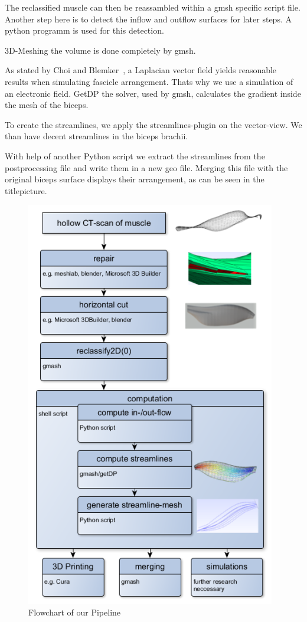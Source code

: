 \documentclass[preprint,journal]{vgtc}       %
\begin{document}
The reclassified muscle can then be reassambled within a gmsh specific script file.
Another step here is to detect the inflow and outflow surfaces for later steps. 
A python programm is used for this detection. 

3D-Meshing the volume is done completely by gmsh. %
 
As stated by Choi and Blemker~\cite{Choi2013}, a Laplacian vector field yields reasonable results when simulating fascicle arrangement. 
Thats why we use a simulation of an electronic field. 
GetDP the solver, used by gmsh, calculates the gradient inside the mesh of the biceps.

To create the streamlines, we apply the streamlines-plugin on the vector-view. 
We than have decent streamlines in the biceps brachii.

With help of another Python script we extract the streamlines from the postprocessing file and write them in a new geo file. 
Merging this file with the original biceps surface displays their arrangement, as can be seen in the titlepicture.
\begin{figure}
	\begin{center}
		\includegraphics[width=.7\linewidth]{flow.png}
	\end{center}
	\caption{Flowchart of our Pipeline}
	\label{fig:flow}
	
\end{figure}
\end{document}
